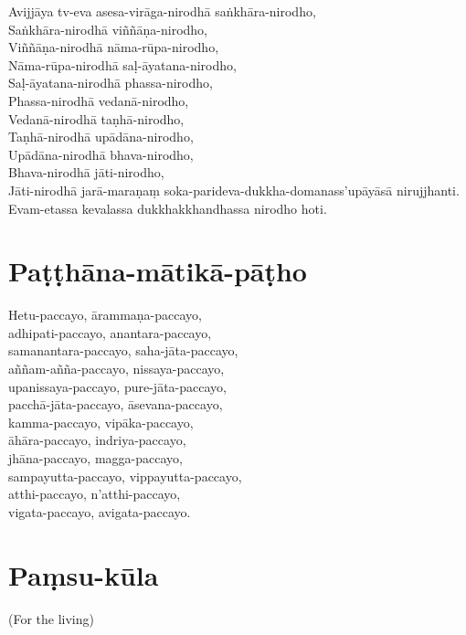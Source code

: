 Avijjāya tv-eva asesa-virāga-nirodhā saṅkhāra-nirodho,\\
Saṅkhāra-nirodhā viññāṇa-nirodho,\\
Viññāṇa-nirodhā nāma-rūpa-nirodho,\\
Nāma-rūpa-nirodhā saḷ-āyatana-nirodho,\\
Saḷ-āyatana-nirodhā phassa-nirodho,\\
Phassa-nirodhā vedanā-nirodho,\\
Vedanā-nirodhā taṇhā-nirodho,\\
Taṇhā-nirodhā upādāna-nirodho,\\
Upādāna-nirodhā bhava-nirodho,\\
Bhava-nirodhā jāti-nirodho,\\
Jāti-nirodhā jarā-maraṇaṃ soka-parideva-dukkha-domanass'upāyāsā nirujjhanti.\\
Evam-etassa kevalassa dukkhakkhandhassa nirodho hoti.


\section{Paṭṭhāna-mātikā-pāṭho}

Hetu-paccayo, ārammaṇa-paccayo,\\
adhipati-paccayo, anantara-paccayo,\\
samanantara-paccayo, saha-jāta-paccayo,\\
aññam-añña-paccayo, nissaya-paccayo,\\
upanissaya-paccayo, pure-jāta-paccayo,\\
pacchā-jāta-paccayo, āsevana-paccayo,\\
kamma-paccayo, vipāka-paccayo,\\
āhāra-paccayo, indriya-paccayo,\\
jhāna-paccayo, magga-paccayo,\\
sampayutta-paccayo, vippayutta-paccayo,\\
atthi-paccayo, n'atthi-paccayo,\\
vigata-paccayo, avigata-paccayo.


\clearpage

\section{Paṃsu-kūla}

(For the living)


